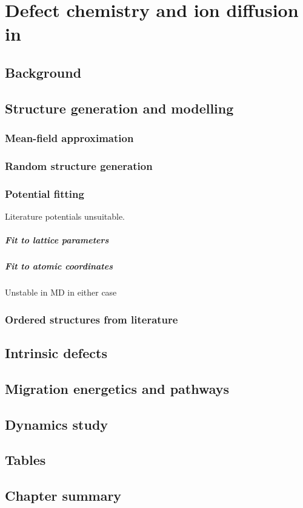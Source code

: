 \chapter{Defect chemistry and  ion diffusion in }
\section{Background}

\section{Structure generation and modelling}
\subsection{Mean-field approximation}

\subsection{Random structure generation}
\subsection{Potential fitting}
Literature potentials unsuitable.
\paragraph{Fit to lattice parameters}
\paragraph{Fit to atomic coordinates}
Unstable in MD in either case

\subsection{Ordered structures from literature}

\section{Intrinsic defects}

\section{Migration energetics and pathways}

\section{Dynamics study}

\section{Tables}

\section{Chapter summary}